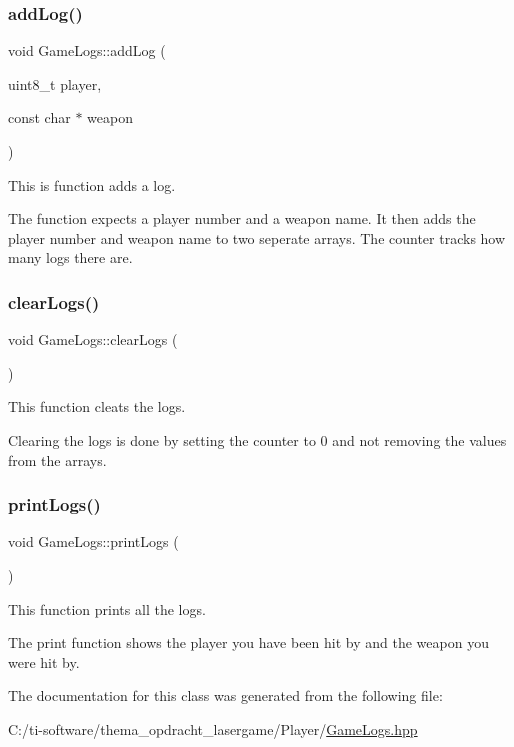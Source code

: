 \subsubsection{\texorpdfstring{add\+Log()}{addLog()}}
{\footnotesize\ttfamily void Game\+Logs\+::add\+Log (\begin{DoxyParamCaption}\item[{uint8\+\_\+t}]{player,  }\item[{const char $\ast$}]{weapon }\end{DoxyParamCaption})\hspace{0.3cm}{\ttfamily [inline]}}



This is function adds a log. 

The function expects a player number and a weapon name. It then adds the player number and weapon name to two seperate arrays. The counter tracks how many logs there are. \mbox{\label{class_game_logs_ab645b6718f2d5ee716c8b4df4dddf561}} 
\subsubsection{\texorpdfstring{clear\+Logs()}{clearLogs()}}
{\footnotesize\ttfamily void Game\+Logs\+::clear\+Logs (\begin{DoxyParamCaption}{ }\end{DoxyParamCaption})\hspace{0.3cm}{\ttfamily [inline]}}



This function cleats the logs. 

Clearing the logs is done by setting the counter to 0 and not removing the values from the arrays. \mbox{\label{class_game_logs_a8c7dec27f1cd0c1b6df508b9e3172459}} 
\subsubsection{\texorpdfstring{print\+Logs()}{printLogs()}}
{\footnotesize\ttfamily void Game\+Logs\+::print\+Logs (\begin{DoxyParamCaption}{ }\end{DoxyParamCaption})\hspace{0.3cm}{\ttfamily [inline]}}



This function prints all the logs. 

The print function shows the player you have been hit by and the weapon you were hit by. 

The documentation for this class was generated from the following file\+:\begin{DoxyCompactItemize}
\item 
C\+:/ti-\/software/thema\+\_\+opdracht\+\_\+lasergame/\+Player/\mbox{\hyperlink{_game_logs_8hpp}{Game\+Logs.\+hpp}}\end{DoxyCompactItemize}
